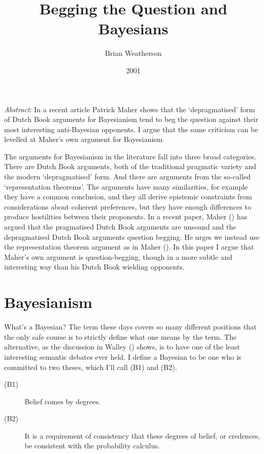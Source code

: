 \documentclass[
  11pt,
  letterpaper,
  DIV=11,
  numbers=noendperiod,
  twoside]{scrartcl}
\title{Begging the Question and Bayesians}
\author{Brian Weatherson}
\date{2001}
\renewenvironment{abstract}
 {\vspace{-1.25cm}
 \quotation\small\noindent\emph{Abstract}:}
 {\endquotation}
\begin{document}
\maketitle
\begin{abstract}
In a recent article Patrick Maher shows that the `depragmatised' form of
Dutch Book arguments for Bayesianism tend to beg the question against
their most interesting anti-Bayesian opponents. I argue that the same
criticism can be levelled at Maher's own argument for Bayesianism.
\end{abstract}


The arguments for Bayesianism in the literature fall into three broad
categories. There are Dutch Book arguments, both of the traditional
pragmatic variety and the modern `depragmatised' form. And there are
arguments from the so-called `representation theorems'. The arguments
have many similarities, for example they have a common conclusion, and
they all derive epistemic constraints from considerations about coherent
preferences, but they have enough differences to produce hostilities
between their proponents. In a recent paper, Maher
() has argued that the pragmatised Dutch
Book arguments are unsound and the depragmatised Dutch Book arguments
question begging. He urges we instead use the representation theorem
argument as in Maher (). In this paper I
argue that Maher's own argument is question-begging, though in a more
subtle and interesting way than his Dutch Book wielding opponents.

\section{Bayesianism}\label{bayesianism}

What's a Bayesian? The term these days covers so many different
positions that the only safe course is to strictly define what one means
by the term. The alternative, as the discussion in Walley
() shows, is to have one of the least
interesting semantic debates ever held. I define a Bayesian to be one
who is committed to two theses, which I'll call (B1) and (B2).

\begin{description}
\item[(B1)]
Belief comes by degrees.
\item[(B2)]
It is a requirement of consistency that these degrees of belief, or
credences, be consistent with the probability calculus.
\end{description}
\end{document}
